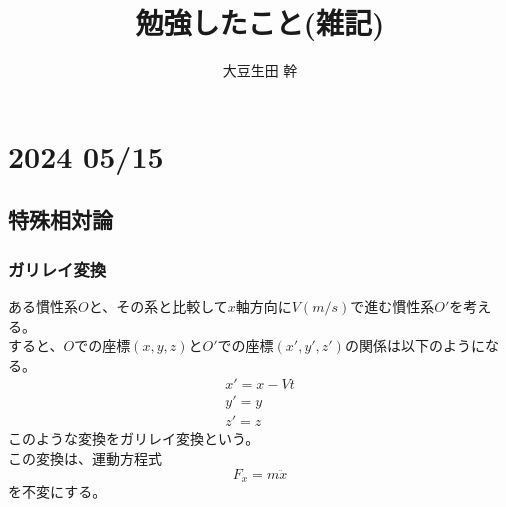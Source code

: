 \documentclass[dvipdfmx]{report} %
\title{勉強したこと(雑記)}
\author{大豆生田 幹}
\date{}
\begin{document}
\maketitle %
\tableofcontents %

\chapter{2024 05/15}

\section{特殊相対論}

\subsection{ガリレイ変換}
ある慣性系$O$と、その系と比較して$x$軸方向に$V(m/s)$で進む慣性系$O'$を考える。\\
すると、$O$での座標$(x, y, z)$と$O'$での座標$(x', y', z')$の関係は以下のようになる。\\
\begin{eqnarray}
    x' = x - Vt \\
    y' = y \\
    z' = z
\end{eqnarray}
このような変換をガリレイ変換という。\\
この変換は、運動方程式
$$F_x = m\ddot{x}$$
を不変にする。
\end{document}
